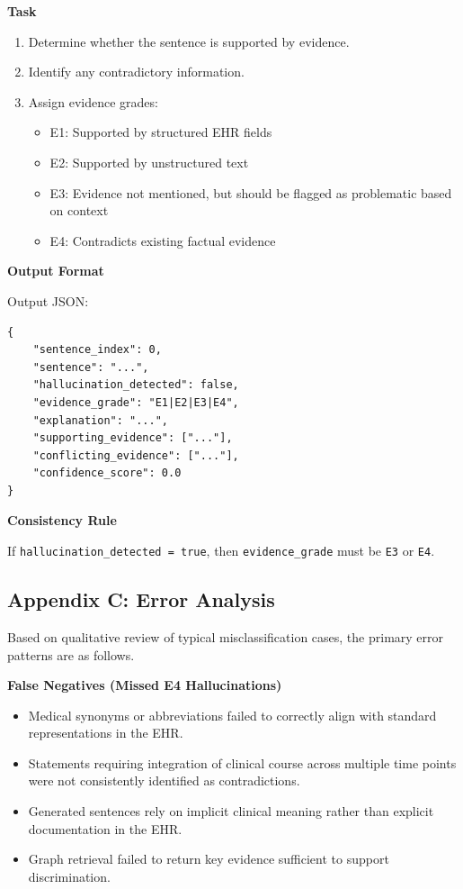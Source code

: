 \documentclass[11pt]{article}
\providecommand{\tightlist}{\setlength{\itemsep}{0pt}\setlength{\parskip}{0pt}}
\begin{document}
\textbf{Task}

\begin{enumerate}
\def\labelenumi{\arabic{enumi}.}
\tightlist
\item
  Determine whether the sentence is supported by evidence.
\item
  Identify any contradictory information.
\item
  Assign evidence grades:

  \begin{itemize}
  \tightlist
  \item
    E1: Supported by structured EHR fields
  \item
    E2: Supported by unstructured text
  \item
    E3: Evidence not mentioned, but should be flagged as problematic based on context
  \item
    E4: Contradicts existing factual evidence
  \end{itemize}
\end{enumerate}

\textbf{Output Format}

Output JSON:

\begin{verbatim}
{
    "sentence_index": 0,
    "sentence": "...",
    "hallucination_detected": false,
    "evidence_grade": "E1|E2|E3|E4",
    "explanation": "...",
    "supporting_evidence": ["..."],
    "conflicting_evidence": ["..."],
    "confidence_score": 0.0
}
\end{verbatim}

\textbf{Consistency Rule}

If \texttt{hallucination\_detected\ =\ true}, then \texttt{evidence\_grade} must be \texttt{E3} or \texttt{E4}.

\subsection{Appendix C: Error Analysis}

Based on qualitative review of typical misclassification cases, the primary error patterns are as follows.

\textbf{False Negatives (Missed E4 Hallucinations)}

\begin{itemize}
\tightlist
\item
  Medical synonyms or abbreviations failed to correctly align with standard representations in the EHR.
\item
  Statements requiring integration of clinical course across multiple time points were not consistently identified as contradictions.
\item
  Generated sentences rely on implicit clinical meaning rather than explicit documentation in the EHR.
\item
  Graph retrieval failed to return key evidence sufficient to support discrimination.
\end{itemize}
\end{document}
